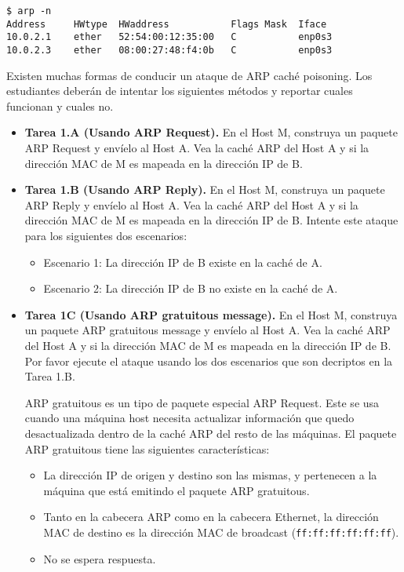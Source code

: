 \begin{lstlisting}
$ arp -n
Address     HWtype  HWaddress           Flags Mask  Iface
10.0.2.1    ether   52:54:00:12:35:00   C           enp0s3
10.0.2.3    ether   08:00:27:48:f4:0b   C           enp0s3
\end{lstlisting}

Existen muchas formas de conducir un ataque de ARP caché poisoning. Los estudiantes deberán de intentar los siguientes métodos y reportar cuales funcionan y cuales no.

\begin{itemize}
\item \textbf{Tarea 1.A (Usando ARP Request).} En el Host M, construya un paquete ARP Request y envíelo al Host A. Vea la caché ARP del Host A y si la dirección MAC de M es mapeada en la dirección IP de B.

\item \textbf{Tarea 1.B (Usando ARP Reply).} En el Host M, construya un paquete ARP Reply y envíelo al Host A. Vea la caché ARP del Host A y si la dirección MAC de M es mapeada en la dirección IP de B.
Intente este ataque para los siguientes dos escenarios:

    \begin{itemize}
      \item Escenario 1: La dirección IP de B existe en la caché de A.
      \item Escenario 2: La dirección IP de B no existe en la caché de A.
    \end{itemize}
     
    
\item \textbf{Tarea 1C (Usando ARP gratuitous message).} En el Host M, construya un paquete ARP gratuitous message y envíelo al Host A. Vea la caché ARP del Host A y si la dirección MAC de M es mapeada en la dirección IP de B.  Por favor ejecute el ataque usando los dos escenarios que son decriptos en la Tarea 1.B.

ARP gratuitous es un tipo de paquete especial ARP Request. Este se usa cuando una máquina host necesita actualizar información que quedo desactualizada dentro de la caché ARP del resto de las máquinas. El paquete ARP gratuitous tiene las siguientes características:

\begin{itemize}
\item La dirección IP de origen y destino son las mismas, y pertenecen a la máquina que está emitindo el paquete ARP gratuitous.

\item Tanto en la cabecera ARP como en la cabecera Ethernet, la dirección MAC de destino es la dirección MAC de broadcast ({\tt ff:ff:ff:ff:ff:ff}).

\item No se espera respuesta.
\end{itemize}
\end{itemize}



